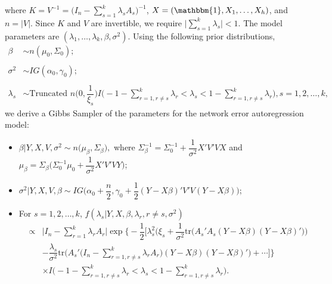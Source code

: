 \documentclass[times, doublespace]{auth}
\begin{document}
where $K = V^{-1} = \bigg(I_{n} - \sum\limits_{s=1}^{k} \lambda_{s}A_{s}\bigg)^{-1}$, $X=(\mathbbm{1}, X_{1}, \ldots, X_{h})$, and $n = \vert V\vert$. Since $K$ and $V$ are invertible, we require $\vert \sum\limits_{s=1}^{k} \lambda_{s}\vert < 1$. The model parameters are $(\lambda_{1}, \ldots, \lambda_{k}, \beta, \sigma^{2})$. Using the following prior distributions,
\begin{equation}
\label{eqn: 8}
\begin{array}{rl}
\beta &\sim n(\mu_{0}, \Sigma_{0});\\
\\
\sigma^{2} &\sim IG(\alpha_{0},\gamma_{0});\\
\\
\lambda_{s} &\sim \text{Truncated } n\bigg(0,\dfrac{1}{\xi_{s}}\bigg)I\bigg(-1-\sum\limits_{r=1, r \ne s}^{k}\lambda_{r} < \lambda_{s} < 1- \sum\limits_{r=1, r \ne s}^{k}\lambda_{r}\bigg), s=1,2,\ldots,k,
\end{array}
\end{equation}
we derive a Gibbs Sampler of the parameters for the network error autoregression model:
\begin{itemize}
	\item $\beta \vert Y, X, V, \sigma^{2} \sim n\bigg(\mu_{\beta}, \Sigma_{\beta}\bigg),$ where $\Sigma_{\beta}^{-1} = \Sigma_{0}^{-1} + \dfrac{1}{\sigma^{2}}X'V'VX$ and \\ 
	$\mu_{\beta} = \Sigma_{\beta}\bigg(\Sigma_{0}^{-1}\mu_{0} + \dfrac{1}{\sigma^{2}}X'V'VY\bigg)$;
	\item $\sigma^{2} \vert Y, X, V, \beta \sim IG\bigg(\alpha_{0} + \dfrac{n}{2}, \gamma_{0}+\dfrac{1}{2}(Y-X\beta)'V'V(Y-X\beta)\bigg)$;
	\item For $s = 1,2, \ldots, k$, 
	\newline
	\noindent $f(\lambda_{s}\vert Y, X, \beta, \lambda_{r}, r \ne s, \sigma^{2})$
	\begin{equation}
	\label{eqn: 9}
	\begin{aligned}
	& \propto & \big\vert I_{n} - \sum\limits_{r=1}^{k} \lambda_{r}A_{r}\big\vert \exp\bigg\{-\dfrac{1}{2}\bigg[\lambda_{s}^{2}\bigg(\xi_{s} + \dfrac{1}{\sigma^{2}}\text{tr}\big(A_{s}'A_{s}(Y-X\beta)(Y-X\beta)'\big)\bigg)\\
	&& -\dfrac{\lambda_{s}}{\sigma^{2}}\text{tr}\bigg(A_{s}'\bigg(I_{n}-\sum\limits_{r=1, r \ne s}^{k} \lambda_{r}A_{r}\bigg)(Y-X\beta)(Y-X\beta)'\bigg)+\cdots\bigg]\bigg\}\\
	&& \times I\bigg(-1-\sum\limits_{r=1, r \ne s}^{k}\lambda_{r} < \lambda_{s} < 1- \sum\limits_{r=1, r \ne s}^{k}\lambda_{r}\bigg).
	\end{aligned}
	\end{equation}
\end{itemize}
\end{document}
